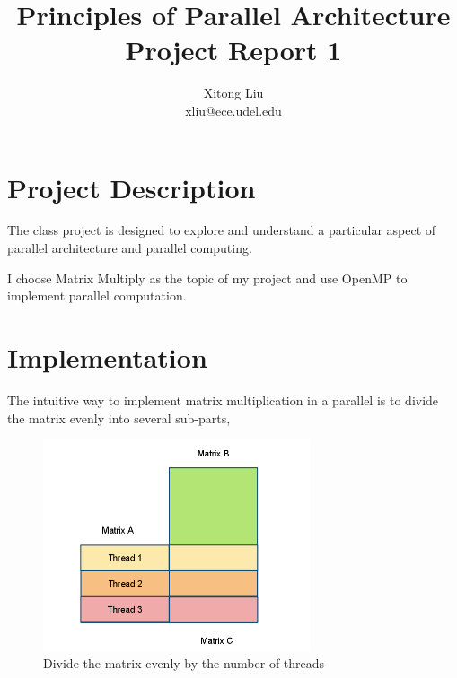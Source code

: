 \documentclass[12pt]{article}
\title{Principles of Parallel Architecture\\
Project Report 1}
\author{Xitong Liu \\
xliu@ece.udel.edu}
\begin{document}
\maketitle

\section{Project Description}
The class project is designed to explore and understand 
a particular aspect of parallel architecture and parallel 
computing.

I choose Matrix Multiply as the topic of my project and 
use OpenMP to implement parallel computation.

\section{Implementation}
The intuitive way to implement matrix multiplication in a 
parallel is to divide the matrix evenly into several
sub-parts, 

\begin{figure}[h!]
	\begin{center}
		\includegraphics[width=0.7\textwidth, angle=0]{matrix-divide.png}
		\caption{\label{fig:matrix-divide}Divide the matrix evenly by the number of threads}
	\end{center}
\end{figure}
\end{document}
